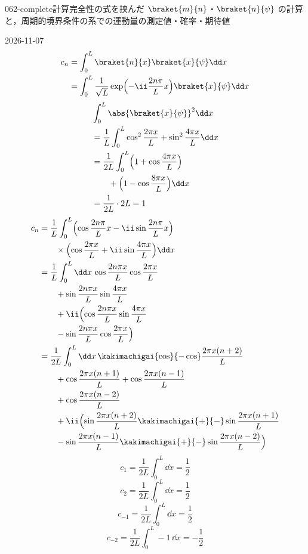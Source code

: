 \documentclass[uplatex,dvipdfmx,a4paper,11pt]{jsarticle}
\begin{document}
\begin{mondai}{062-complete}{計算}{完全性の式を挟んだ $\braket{m}{n}$・$\braket{n}{\psi}$ の計算と，周期的境界条件の系での運動量の測定値・確率・期待値}
\begin{kotaeutsushi}{2026-11-07}
\begin{align*}
c_{n}&=\int_{0}^{L}\braket{n}{x}\braket{x}{\psi}\dd x\\
&=\int_{0}^{L}\frac{1}{\sqrt{L}}\exp\Bigl(-\ii\frac{2n\pi}{L}x\Bigr)\braket{x}{\psi}\dd x
\end{align*}
\begin{align*}
&\int_{0}^{L}\abs{\braket{x}{\psi}}^{2}\dd x\\
&=\frac{1}{L}\int_{0}^{L}\cos^{2}\frac{2\pi x}{L}+\sin^{2}\frac{4\pi x}{L}\dd x\\
&=\frac{1}{2L}\int_{0}^{L}\Bigl(1+\cos\frac{4\pi x}{L}\Bigr)\\
&\qquad+\Bigl(1-\cos\frac{8\pi x}{L}\Bigr)\dd x\\
&=\frac{1}{2L}\cdot2L=1
\end{align*}
\begin{align*}
c_{n}&=\frac{1}{L}\int_{0}^{L}\Bigl(\cos\frac{2n\pi}{L}x-\ii\sin\frac{2n\pi}{L}x\Bigr)\\
&\qquad\times\Bigl(\cos\frac{2\pi x}{L}+\ii\sin\frac{4\pi x}{L}\Bigr)\dd x\\
&=\frac{1}{L}\int_{0}^{L}\dd x\,\cos\frac{2n\pi x}{L}\cos\frac{2\pi x}{L}\\
&\qquad+\sin\frac{2n\pi x}{L}\sin\frac{4\pi x}{L}\\
&\qquad+\ii\Bigl(\cos\frac{2n\pi x}{L}\sin\frac{4\pi x}{L}\\
&\qquad-\sin\frac{2n\pi x}{L}\cos\frac{2\pi x}{L}\Bigr)\\
&=\frac{1}{2L}\int_{0}^{L}\dd x\,\kakimachigai{\cos}{-\cos}\frac{2\pi x(n+2)}{L}\\
&\qquad+\cos\frac{2\pi x(n+1)}{L}+\cos\frac{2\pi x(n-1)}{L}\\
&\qquad+\cos\frac{2\pi x(n-2)}{L}\\
&\qquad+\ii\Bigl(\sin\frac{2\pi x(n+2)}{L}\kakimachigai{+}{-}\sin\frac{2\pi x(n+1)}{L}\\
&\qquad-\sin\frac{2\pi x(n-1)}{L}\kakimachigai{+}{-}\sin\frac{2\pi x(n-2)}{L}\Bigr)
\end{align*}
\[ c_{1}=\frac{1}{2L}\int_{0}^{L}\dd x=\frac{1}{2} \]
\[ c_{2}=\frac{1}{2L}\int_{0}^{L}\dd x=\frac{1}{2} \]
\[ c_{-1}=\frac{1}{2L}\int_{0}^{L}\dd x=\frac{1}{2} \]
\[ c_{-2}=\frac{1}{2L}\int_{0}^{L}-1\,\dd x=-\frac{1}{2} \]

\end{kotaeutsushi}
\end{mondai}
\end{document}
